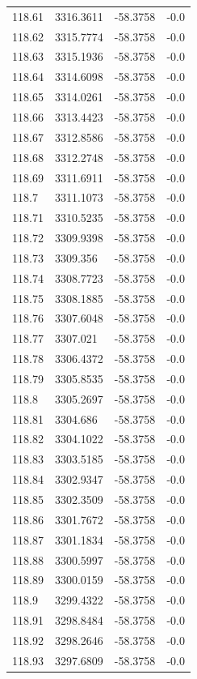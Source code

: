\begin{table}[H]
\begin{tabular}{llll}
118.61 & 3316.3611 & -58.3758 & -0.0 \\
118.62 & 3315.7774 & -58.3758 & -0.0 \\
118.63 & 3315.1936 & -58.3758 & -0.0 \\
118.64 & 3314.6098 & -58.3758 & -0.0 \\
118.65 & 3314.0261 & -58.3758 & -0.0 \\
118.66 & 3313.4423 & -58.3758 & -0.0 \\
118.67 & 3312.8586 & -58.3758 & -0.0 \\
118.68 & 3312.2748 & -58.3758 & -0.0 \\
118.69 & 3311.6911 & -58.3758 & -0.0 \\
118.7 & 3311.1073 & -58.3758 & -0.0 \\
118.71 & 3310.5235 & -58.3758 & -0.0 \\
118.72 & 3309.9398 & -58.3758 & -0.0 \\
118.73 & 3309.356 & -58.3758 & -0.0 \\
118.74 & 3308.7723 & -58.3758 & -0.0 \\
118.75 & 3308.1885 & -58.3758 & -0.0 \\
118.76 & 3307.6048 & -58.3758 & -0.0 \\
118.77 & 3307.021 & -58.3758 & -0.0 \\
118.78 & 3306.4372 & -58.3758 & -0.0 \\
118.79 & 3305.8535 & -58.3758 & -0.0 \\
118.8 & 3305.2697 & -58.3758 & -0.0 \\
118.81 & 3304.686 & -58.3758 & -0.0 \\
118.82 & 3304.1022 & -58.3758 & -0.0 \\
118.83 & 3303.5185 & -58.3758 & -0.0 \\
118.84 & 3302.9347 & -58.3758 & -0.0 \\
118.85 & 3302.3509 & -58.3758 & -0.0 \\
118.86 & 3301.7672 & -58.3758 & -0.0 \\
118.87 & 3301.1834 & -58.3758 & -0.0 \\
118.88 & 3300.5997 & -58.3758 & -0.0 \\
118.89 & 3300.0159 & -58.3758 & -0.0 \\
118.9 & 3299.4322 & -58.3758 & -0.0 \\
118.91 & 3298.8484 & -58.3758 & -0.0 \\
118.92 & 3298.2646 & -58.3758 & -0.0 \\
118.93 & 3297.6809 & -58.3758 & -0.0 \\

\end{tabular}
\end{table}
